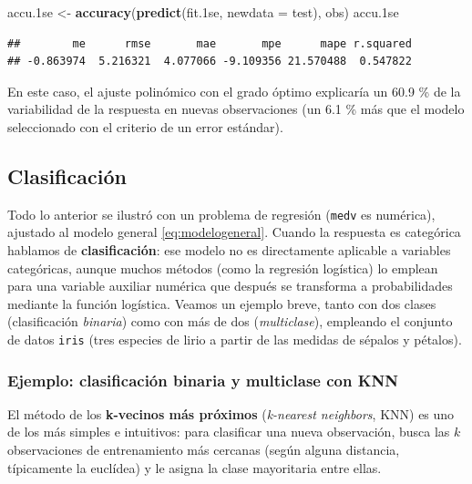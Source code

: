 \documentclass[
]{book}
\newenvironment{Shaded}{\begin{snugshade}}{\end{snugshade}}
\newcommand{\AttributeTok}[1]{\textcolor[rgb]{0.13,0.29,0.53}{#1}}
\newcommand{\FloatTok}[1]{\textcolor[rgb]{0.00,0.00,0.81}{#1}}
\newcommand{\FunctionTok}[1]{\textcolor[rgb]{0.13,0.29,0.53}{\textbf{#1}}}
\newcommand{\NormalTok}[1]{#1}
\newcommand{\OtherTok}[1]{\textcolor[rgb]{0.56,0.35,0.01}{#1}}
\theoremstyle{break}
\theoremstyle{nonumberplain}
\begin{document}
\begin{Shaded}
\begin{Highlighting}[]
\NormalTok{accu}\FloatTok{.1}\NormalTok{se }\OtherTok{\textless{}{-}} \FunctionTok{accuracy}\NormalTok{(}\FunctionTok{predict}\NormalTok{(fit}\FloatTok{.1}\NormalTok{se, }\AttributeTok{newdata =}\NormalTok{ test), obs)}
\NormalTok{accu}\FloatTok{.1}\NormalTok{se}
\end{Highlighting}
\end{Shaded}

\begin{verbatim}
##        me      rmse       mae       mpe      mape r.squared 
## -0.863974  5.216321  4.077066 -9.109356 21.570488  0.547822
\end{verbatim}

En este caso, el ajuste polinómico con el grado óptimo explicaría un 60.9 \% de la variabilidad de la respuesta en nuevas observaciones (un 6.1 \% más que el modelo seleccionado con el criterio de un error estándar).

\subsection{Clasificación}\label{clasificacion}

Todo lo anterior se ilustró con un problema de regresión (\texttt{medv} es numérica), ajustado al modelo general \eqref{eq:modelogeneral}. Cuando la respuesta es categórica hablamos de \textbf{clasificación}: ese modelo no es directamente aplicable a variables categóricas, aunque muchos métodos (como la regresión logística) lo emplean para una variable auxiliar numérica que después se transforma a probabilidades mediante la función logística. Veamos un ejemplo breve, tanto con dos clases (clasificación \emph{binaria}) como con más de dos (\emph{multiclase}), empleando el conjunto de datos \texttt{iris} (tres especies de lirio a partir de las medidas de sépalos y pétalos).

\subsubsection{Ejemplo: clasificación binaria y multiclase con KNN}\label{knn-ejemplo}

El método de los \textbf{k-vecinos más próximos} (\emph{k-nearest neighbors}, KNN) es uno de los más simples e intuitivos: para clasificar una nueva observación, busca las \(k\) observaciones de entrenamiento más cercanas (según alguna distancia, típicamente la euclídea) y le asigna la clase mayoritaria entre ellas.
\end{document}
